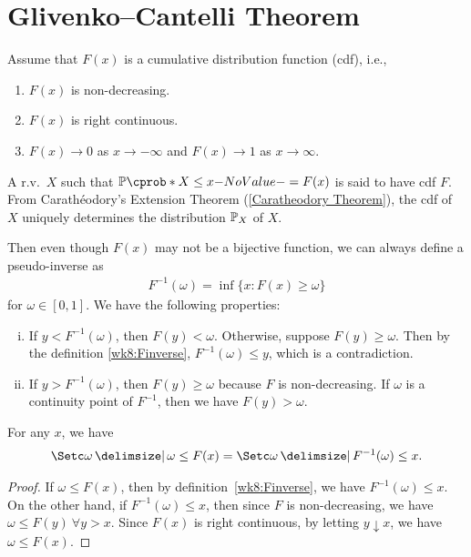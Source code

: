 \documentclass[12pt]{article}
\begin{document}

\section{Glivenko–Cantelli Theorem}

Assume that $F(x)$ is a cumulative distribution function (cdf), i.e., 
\begin{enumerate}[-]
\item $F(x)$ is non-decreasing.
\item $F(x)$ is right continuous.
\item $F(x) \to 0$ as $x \to -\infty$ and $F(x) \to1$ as $x \to \infty$.
\end{enumerate}
A r.v.\ $X$ such that $\P(X\leq x) = F(x)$ is said to have cdf $F$. From Carath{\'e}odory's Extension Theorem (\cref{Caratheodory Theorem}), the cdf of $X$ uniquely determines the distribution $\P_X$ of $X$.

Then even though $F(x)$ may not be a bijective function, we can always define a pseudo-inverse as
\begin{align}\label{wk8:Finverse}
F^{-1}(\omega)= \inf \{x: F(x)\geq \omega\}  
\end{align}
for $\omega \in [0,1]$. We have the following properties:
\begin{enumerate}[(i)]
\item If $y < F^{-1}(\omega)$, then $F(y)< \omega$.
Otherwise, suppose $F(y) \geq \omega$. Then by the definition \cref{wk8:Finverse}, $F^{-1}(\omega)\leq y$, which is a contradiction.
\item If $y > F^{-1}(\omega)$, then $F(y)\geq \omega$ because $F$ is non-decreasing. If $\omega$ is a continuity point of $F^{-1}$, then we have $F(y) > \omega$.
\end{enumerate}

\begin{Lemma} \label{wk8:lemma:set}
For any $x$, we have
\begin{align*}
\set{\omega\given \omega \leq F(x)}=\set{\omega\given F^{-1}(\omega)\leq x}.
\end{align*}
\end{Lemma}
\begin{proof}
If $\omega \leq F(x)$, then by definition~\cref{wk8:Finverse}, we have $F^{-1}(\omega)\leq x$. On the other hand, if $F^{-1}(\omega) \leq x$, then since $F$ is non-decreasing, we have $\omega \leq F(y) \ \forall y > x$. Since $F(x)$ is right continuous, by letting $y \downarrow x$, we have $\omega \leq F(x)$.
\end{proof}
\end{document}
